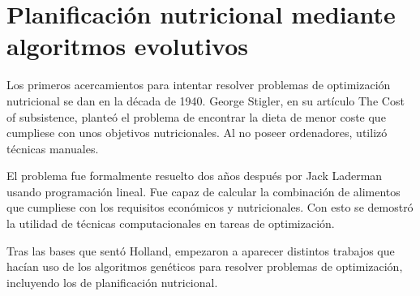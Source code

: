 \section{Planificación nutricional mediante algoritmos evolutivos}

Los primeros acercamientos para intentar resolver problemas de optimización nutricional se dan en la década de 1940. George Stigler, en su artículo The Cost of subsistence, planteó el problema de encontrar la dieta de menor coste que cumpliese con unos objetivos nutricionales. Al no poseer ordenadores, utilizó técnicas manuales.

El problema fue formalmente resuelto dos años después por Jack Laderman usando programación lineal. Fue capaz de calcular la combinación de alimentos que cumpliese con los requisitos económicos y nutricionales. Con esto se demostró la utilidad de técnicas computacionales en tareas de optimización.

Tras las bases que sentó Holland, empezaron a aparecer distintos trabajos que hacían uso de los algoritmos genéticos para resolver problemas de optimización, incluyendo los de planificación nutricional. 








